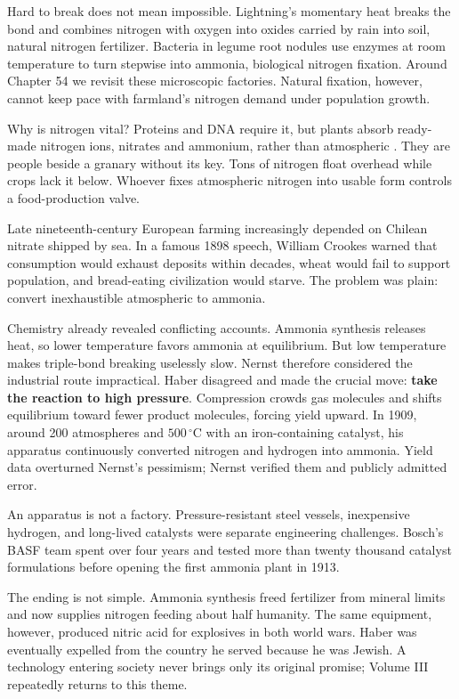 Hard to break does not mean impossible. Lightning's momentary heat breaks the bond and combines nitrogen with oxygen into oxides carried by rain into soil, natural nitrogen fertilizer. Bacteria in legume root nodules use enzymes at room temperature to turn  stepwise into ammonia, biological nitrogen fixation. Around Chapter 54 we revisit these microscopic factories. Natural fixation, however, cannot keep pace with farmland's nitrogen demand under population growth.

Why is nitrogen vital? Proteins and DNA require it, but plants absorb ready-made nitrogen ions, nitrates and ammonium, rather than atmospheric . They are people beside a granary without its key. Tons of nitrogen float overhead while crops lack it below. Whoever fixes atmospheric nitrogen into usable form controls a food-production valve.

\begin{zhengju}
Late nineteenth-century European farming increasingly depended on Chilean nitrate shipped by sea. In a famous 1898 speech, William Crookes warned that consumption would exhaust deposits within decades, wheat would fail to support population, and bread-eating civilization would starve. The problem was plain: convert inexhaustible atmospheric  to ammonia.

Chemistry already revealed conflicting accounts. Ammonia synthesis releases heat, so lower temperature favors ammonia at equilibrium. But low temperature makes triple-bond breaking uselessly slow. Nernst therefore considered the industrial route impractical. Haber disagreed and made the crucial move: \textbf{take the reaction to high pressure}. Compression crowds gas molecules and shifts equilibrium toward fewer product molecules, forcing yield upward. In 1909, around 200 atmospheres and $500\,^{\circ}\mathrm{C}$ with an iron-containing catalyst, his apparatus continuously converted nitrogen and hydrogen into ammonia. Yield data overturned Nernst's pessimism; Nernst verified them and publicly admitted error.

An apparatus is not a factory. Pressure-resistant steel vessels, inexpensive hydrogen, and long-lived catalysts were separate engineering challenges. Bosch's BASF team spent over four years and tested more than twenty thousand catalyst formulations before opening the first ammonia plant in 1913.

The ending is not simple. Ammonia synthesis freed fertilizer from mineral limits and now supplies nitrogen feeding about half humanity. The same equipment, however, produced nitric acid for explosives in both world wars. Haber was eventually expelled from the country he served because he was Jewish. A technology entering society never brings only its original promise; Volume III repeatedly returns to this theme.
\end{zhengju}

